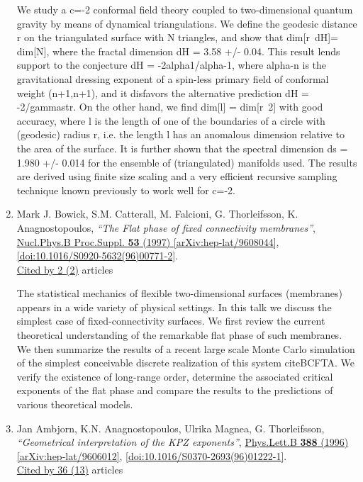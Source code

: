 \documentclass[a4paper,10pt]{article}
\begin{document}
\begin{enumerate}
We study a c=-2 conformal field theory coupled to two-dimensional quantum gravity by means of dynamical triangulations. We define the geodesic distance r on the triangulated surface with N triangles, and show that dim[r~{dH}]= dim[N], where the fractal dimension dH = 3.58 +/- 0.04. This result lends support to the conjecture dH = -2alpha1/alpha{-1}, where alpha{-n} is the gravitational dressing exponent of a spin-less primary field of conformal weight (n+1,n+1), and it disfavors the alternative prediction dH = -2/gamma{str}. On the other hand, we find dim[l] = dim[r~2] with good accuracy, where l is the length of one of the boundaries of a circle with (geodesic) radius r, i.e. the length l has an anomalous dimension relative to the area of the surface. It is further shown that the spectral dimension ds = 1.980 +/- 0.014 for the ensemble of (triangulated) manifolds used. The results are derived using finite size scaling and a very efficient recursive sampling technique known previously to work well for c=-2.
\item Mark J. Bowick, S.M. Catterall, M. Falcioni, G. Thorleifsson, K. Anagnostopoulos, {\it ``The Flat phase of fixed connectivity membranes''}, \href{https://www.doi.org/10.1016/S0920-5632(96)00771-2}{Nucl.Phys.B Proc.Suppl. {\bf 53} (1997) } \href{https://arxiv.org/abs/hep-lat/9608044}{[arXiv:hep-lat/9608044]}, \href{https://www.doi.org/10.1016/S0920-5632(96)00771-2}{[doi:10.1016/S0920-5632(96)00771-2]}.
\\\href{https://inspirehep.net/literature/?q=refersto%3Arecid%3A421798}{Cited by 2 (2)} articles

The statistical mechanics of flexible two-dimensional surfaces (membranes) appears in a wide variety of physical settings. In this talk we discuss the simplest case of fixed-connectivity surfaces. We first review the current theoretical understanding of the remarkable flat phase of such membranes. We then summarize the results of a recent large scale Monte Carlo simulation of the simplest conceivable discrete realization of this system cite{BCFTA}. We verify the existence of long-range order, determine the associated critical exponents of the flat phase and compare the results to the predictions of various theoretical models.
\item Jan Ambjorn, K.N. Anagnostopoulos, Ulrika Magnea, G. Thorleifsson, {\it ``Geometrical interpretation of the KPZ exponents''}, \href{https://www.doi.org/10.1016/S0370-2693(96)01222-1}{Phys.Lett.B {\bf 388} (1996) } \href{https://arxiv.org/abs/hep-lat/9606012}{[arXiv:hep-lat/9606012]}, \href{https://www.doi.org/10.1016/S0370-2693(96)01222-1}{[doi:10.1016/S0370-2693(96)01222-1]}.
\\\href{https://inspirehep.net/literature/?q=refersto%3Arecid%3A419952}{Cited by 36 (13)} articles


\end{enumerate}
\end{document}
